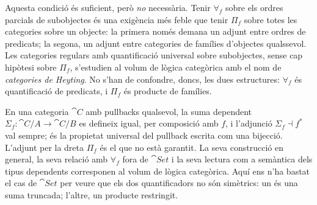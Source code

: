 Aquesta condició és suficient, però \emph{no} necessària. Tenir $\forall_f$ sobre els ordres parcials de subobjectes és una exigència més feble que tenir $\Pi_f$ sobre totes les categories sobre un objecte: la primera només demana un adjunt entre ordres de predicats; la segona, un adjunt entre categories de famílies d'objectes qualssevol. Les categories regulars amb quantificació universal sobre subobjectes, sense cap hipòtesi sobre $\Pi_f$, s'estudien al volum de lògica categòrica amb el nom de \emph{categories de Heyting}. No s'han de confondre, doncs, les dues estructures: $\forall_f$ és quantificació de predicats, i $\Pi_f$ és producte de famílies.

\begin{observacio}
En una categoria $\cat{C}$ amb pullbacks qualsevol, la suma dependent $\Sigma_f\colon\cat{C}/A\to\cat{C}/B$ es defineix igual, per composició amb $f$, i l'adjunció $\Sigma_f\dashv f^{*}$ val sempre; és la propietat universal del pullback escrita com una bijecció. L'adjunt per la dreta $\Pi_f$ és el que no està garantit. La seva construcció en general, la seva relació amb $\forall_f$ fora de $\cat{Set}$ i la seva lectura com a semàntica dels tipus dependents corresponen al volum de lògica categòrica. Aquí ens n'ha bastat el cas de $\cat{Set}$ per veure que els dos quantificadors no són simètrics: un és una suma truncada; l'altre, un producte restringit.
\end{observacio}

